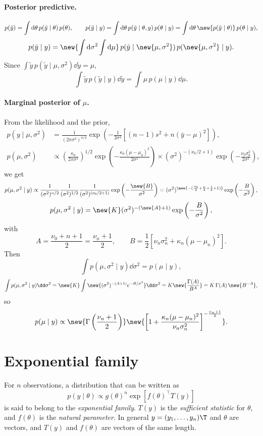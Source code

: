\paragraph{Posterior predictive.}
\[
p(\tilde y) = \int \mathrm{d}\theta\,p(\tilde y \mid \theta)\,p(\theta),
\qquad
p(\tilde y \mid y) = \int \mathrm{d}\theta\,p(\tilde y \mid \theta, y)\,p(\theta \mid y) = \int \mathrm{d}\theta\,\new{p(\tilde y \mid \theta)}\,p(\theta \mid y),
\]
\[
p(\tilde y \mid y) = \new{\int \mathrm{d}\sigma^2\int \mathrm{d}\mu}\,p(\tilde y \mid \new{\mu, \sigma^2})\,p(\new{\mu, \sigma^2} \mid y).
\]
Since $\int \tilde y\,p(\tilde y \mid \mu, \sigma^2)\dd\tilde y = \mu$,
\[
\int \tilde y\,p(\tilde y \mid y)\dd\tilde y = \int \mu\,p(\mu \mid y)\dd\mu.
\]

\paragraph{Marginal posterior of $\mu$.}
From the likelihood and the prior,
\begin{align*}
p(y \mid \mu, \sigma^2) &= \frac{1}{(2\pi\sigma^2)^{n/2}}\exp\left(-\frac{1}{2\sigma^2}\left[(n-1)s^2 + n(\bar y - \mu)^2\right]\right),\\
p(\mu, \sigma^2) &\propto \left(\frac{\kappa_0}{2\pi\sigma^2}\right)^{1/2}\exp\left(-\frac{\kappa_0(\mu - \mu_0)^2}{2\sigma^2}\right)\times(\sigma^2)^{-(\nu_0/2 + 1)}\exp\left(-\frac{\nu_0\sigma_0^2}{2\sigma^2}\right),
\end{align*}
we get
\[
p(\mu, \sigma^2 \mid y) \propto \frac{1}{(\sigma^2)^{n/2}}\frac{1}{(\sigma^2)^{1/2}}\frac{1}{(\sigma^2)^{(\nu_0/2 + 1)}}\exp\left(-\frac{\new{B}}{\sigma^2}\right)
= (\sigma^2)^{\new{-(\frac{\nu_0}{2} + \frac n2 + \frac12 + 1)}}\exp\left(-\frac{B}{\sigma^2}\right),
\]
\[
p(\mu, \sigma^2 \mid y) = \new{K}(\sigma^2)^{-(\new{A}+1)}\exp\left(-\frac{B}{\sigma^2}\right),
\]
with
\[
A = \frac{\nu_0 + n + 1}{2} = \frac{\nu_n + 1}{2},
\qquad
B = \frac12\left[\nu_n\sigma_n^2 + \kappa_n(\mu - \mu_n)^2\right].
\]
Then
\[
\int p(\mu, \sigma^2 \mid y)\dd\sigma^2 = p(\mu \mid y),
\]
\[
\int p(\mu, \sigma^2 \mid y)\dd\sigma^2 = \new{K}\int \new{(\sigma^2)^{-(A+1)}e^{-B/\sigma^2}}\dd\sigma^2 = K\new{\frac{\Gamma(A)}{B^A}} = K\,\Gamma(A)\,\new{B^{-A}},
\]
so
\[
p(\mu \mid y) \propto \new{\Gamma\left(\frac{\nu_n + 1}{2}\right)}\new{\left[1 + \frac{\kappa_n(\mu - \mu_n)^2}{\nu_n\sigma_n^2}\right]^{-\frac{\nu_n + 1}{2}}}.
\]

\section{Exponential family}
For $n$ observations, a distribution that can be written as
\[
p(y \mid \theta) \propto g(\theta)^{n}\exp\left[f(\theta)^{\top}T(y)\right]
\]
is said to belong to the \emph{exponential family}. $T(y)$ is the \emph{sufficient statistic} for $\theta$, and $f(\theta)$ is the \emph{natural parameter}. In general $y = (y_1, \dots, y_n)\T$ and $\theta$ are vectors, and $T(y)$ and $f(\theta)$ are vectors of the same length.

